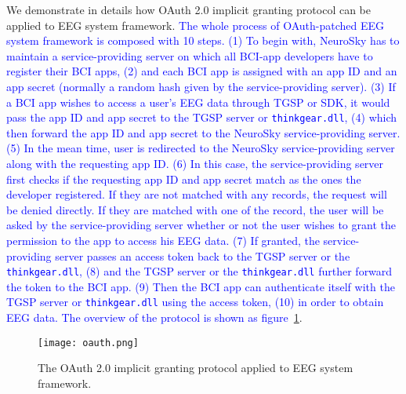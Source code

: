 We demonstrate in details how OAuth 2.0 implicit granting protocol can be applied to EEG system framework.  \textcolor{blue}{The whole process of OAuth-patched EEG system framework is composed with 10 steps. (1) To begin with, NeuroSky has to maintain a service-providing server on which all BCI-app developers have to register their BCI apps, (2) and each BCI app is assigned with an app ID and an app secret (normally a random hash given by the service-providing server). (3) If a BCI app wishes to access a user's EEG data through TGSP or SDK, it would pass the app ID and app secret to the TGSP server or \texttt{thinkgear.dll}, (4) which then forward the app ID and app secret to the NeuroSky service-providing server. (5) In the mean time, user is redirected to the NeuroSky service-providing server along with the requesting app ID. (6) In this case, the service-providing server first checks if the requesting app ID and app secret match as the ones the developer registered. If they are not matched with any records, the request will be denied directly. If they are matched with one of the record, the user will be asked by the service-providing server whether or not the user wishes to grant the permission to the app to access his EEG data. (7) If granted, the service-providing server passes an access token back to the TGSP server or the \texttt{thinkgear.dll}, (8) and the TGSP server or the \texttt{thinkgear.dll} further forward the token to the BCI app. (9) Then the BCI app can authenticate itself with the TGSP server or \texttt{thinkgear.dll} using the access token, (10) in order to obtain EEG data. The overview of the protocol is shown as figure~\ref{fig:oauth}}.

\begin{figure}[!htb]
\hspace*{2cm}
        \texttt{[image: oauth.png]}
	\caption{The OAuth 2.0 implicit granting protocol applied to EEG system framework. }
        \label{fig:oauth}
\end{figure}


